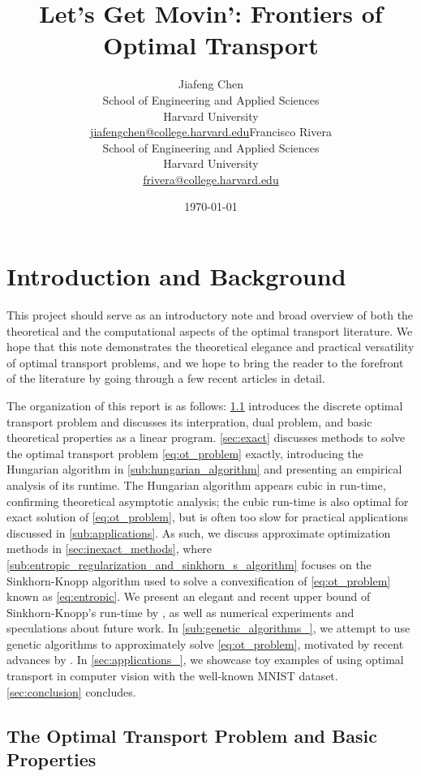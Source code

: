 \documentclass{article}
\title{Let's Get Movin': Frontiers of Optimal Transport}
\author{Jiafeng Chen\\School of Engineering and Applied Sciences\\Harvard University\\\url{jiafengchen@college.harvard.edu}\And Francisco Rivera\\School of Engineering and Applied Sciences\\Harvard University\\\url{frivera@college.harvard.edu}}
\date{\today}
\theoremstyle{definition}
\theoremstyle{remark}
\begin{document}
\maketitle
\section{Introduction and Background}

This project should serve as an introductory note and broad overview of both
 the theoretical and the computational aspects of the
 optimal transport literature. We hope that this note demonstrates the
 theoretical elegance and practical versatility of optimal transport
 problems, and we hope to bring the reader to the forefront of the
 literature by going through a few recent articles in detail.

The organization of this report is as follows: \cref{sub:problem_intro}
introduces the discrete optimal transport problem and discusses its
interpration, dual problem, and basic theoretical properties as a linear
program. \cref{sec:exact} discusses methods to solve the optimal transport
problem \eqref{eq:ot_problem} exactly, introducing the Hungarian algorithm
\cite{kuhn2010hungarian} in \cref{sub:hungarian_algorithm} and presenting an
empirical analysis of its runtime. The Hungarian algorithm appears cubic in
run-time, confirming theoretical asymptotic analysis; the cubic run-time 
is also optimal for exact
solution of \eqref{eq:ot_problem}, but is often too slow for practical
applications discussed in \cref{sub:applications}. As such, we discuss
approximate optimization methods in \cref{sec:inexact_methods}, where
\cref{sub:entropic_regularization_and_sinkhorn_s_algorithm} focuses on the
Sinkhorn-Knopp algorithm used to solve a convexification of
\eqref{eq:ot_problem} known as \ref{eq:entropic}. We present an elegant and
recent upper bound of Sinkhorn-Knopp's run-time by \cite{altschuler2017near}, as
well as numerical experiments and speculations about future work. In
\cref{sub:genetic_algorithms_}, we attempt to use genetic algorithms to
approximately solve \eqref{eq:ot_problem}, motivated by recent advances by
\cite{such2017deep}. In \cref{sec:applications_}, we showcase toy examples of
using optimal transport in computer vision with the well-known MNIST dataset.
\cref{sec:conclusion} concludes.
 
 

\subsection{The Optimal Transport Problem and Basic Properties}
\label{sub:problem_intro}
\end{document}
